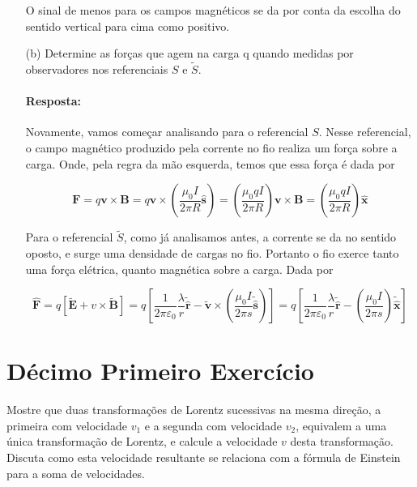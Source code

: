 \documentclass[10pt,a4paper]{article}
\begin{document}
\begin{itemize}
O sinal de menos para os campos magnéticos se da por conta da escolha do sentido vertical para cima como positivo. 
\item[(b)]Determine as forças que agem na carga q quando medidas por observadores nos referenciais $S$ e $\tilde{S}$. 

\paragraph{Resposta:} Novamente, vamos começar analisando para o referencial $S$. Nesse referencial, o campo magnético produzido pela corrente no fio realiza um força  sobre a carga. Onde, pela regra da mão esquerda, temos que essa força é dada por 

\begin{equation*}
	\mathbf{F} = q\mathbf{v}\times\mathbf{B} = q\mathbf{v}\times\left(\frac{\mu_0I}{2\pi R}\mathbf{\hat{s}}\right) = \left(\frac{\mu_0 q I}{2\pi R}\right)\mathbf{v}\times \mathbf{B} = \left(\frac{\mu_0 q I}{2\pi R}\right)\mathbf{\hat{x}}
\end{equation*}

Para o referencial $\tilde{S}$, como já analisamos antes, a corrente se da no sentido oposto, e surge uma densidade de cargas no fio. Portanto o fio exerce tanto uma força elétrica, quanto magnética sobre a carga. Dada por 

\begin{equation*}
\mathbf{\hat{F}} = q[\mathbf{\tilde{E}} + v\times \mathbf{\tilde{B}}] = q\left[\frac{1}{2\pi \varepsilon_0}\frac{\lambda}{r}\mathbf{\tilde{\hat{r}}} - \mathbf{\tilde{v}}\times\left(\frac{\mu_0I}{2\pi s}\mathbf{\tilde{\hat{s}}}\right)\right] = q\left[\frac{1}{2\pi \varepsilon_0}\frac{\lambda}{r}\mathbf{\tilde{\hat{r}}}-\left(\frac{\mu_0 I}{2\pi s}\right)\mathbf{\tilde{\hat{x}}}\right]
\end{equation*}

\end{itemize} 
 
\section{Décimo Primeiro Exercício}
Mostre que duas transformações de Lorentz sucessivas na mesma direção, a primeira com velocidade $ v_1 $ e a segunda com velocidade $ v_2 $, equivalem
a uma única transformação de Lorentz, e calcule a velocidade $ v $ desta transformação. Discuta como esta velocidade resultante se relaciona com a fórmula de Einstein para a soma de velocidades. 
\end{document}
